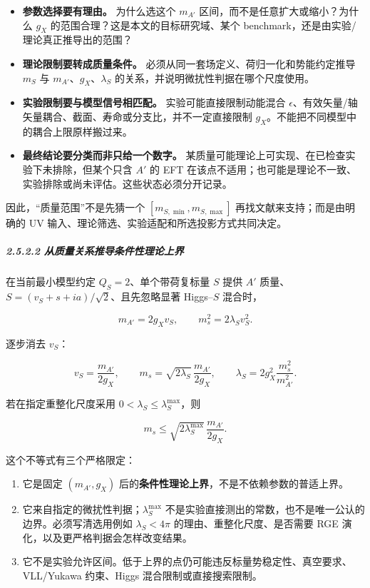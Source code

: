 \documentclass[
]{article}
\providecommand{\tightlist}{%
  \setlength{\itemsep}{0pt}\setlength{\parskip}{0pt}}
\begin{document}
\begin{itemize}
\tightlist
\item
  \textbf{参数选择要有理由。} 为什么选这个 \(m_{A'}\)
  区间，而不是任意扩大或缩小？为什么 \(g_X\)
  的范围合理？这是本文的目标研究域、某个
  benchmark，还是由实验/理论真正推导出的范围？
\item
  \textbf{理论限制要转成质量条件。}
  必须从同一套场定义、荷归一化和势能约定推导 \(m_S\) 与
  \(m_{A'}\)、\(g_X\)、\(\lambda_S\)
  的关系，并说明微扰性判据在哪个尺度使用。
\item
  \textbf{实验限制要与模型信号相匹配。} 实验可能直接限制动能混合
  \(\epsilon\)、有效矢量/轴矢量耦合、截面、寿命或分支比，并不一定直接限制
  \(g_X\)。不能把不同模型中的耦合上限原样搬过来。
\item
  \textbf{最终结论要分类而非只给一个数字。}
  某质量可能理论上可实现、在已检查实验下未排除，但某个只含 \(A'\) 的 EFT
  在该点不适用；也可能是理论不一致、实验排除或尚未评估。这些状态必须分开记录。
\end{itemize}

因此，``质量范围''不是先猜一个 \([m_{S,\min},m_{S,\max}]\)
再找文献来支持；而是由明确的 UV
输入、理论筛选、实验适配和所选投影方式共同决定。

\subparagraph{2.5.2.2
从质量关系推导条件性理论上界}\label{ux4eceux8d28ux91cfux5173ux7cfbux63a8ux5bfcux6761ux4ef6ux6027ux7406ux8bbaux4e0aux754c}

在当前最小模型约定 \(Q_S=2\)、单个带荷复标量 \(S\) 提供 \(A'\)
质量、\(S=(v_S+s+ia)/\sqrt2\)、且先忽略显著 Higgs--\(S\) 混合时，

\[m_{A'}=2g_Xv_S,\qquad m_s^2=2\lambda_Sv_S^2.\]

逐步消去 \(v_S\)：

\[v_S=\frac{m_{A'}}{2g_X},\qquad m_s=\sqrt{2\lambda_S}\,\frac{m_{A'}}{2g_X},\qquad \lambda_S=2g_X^2\frac{m_s^2}{m_{A'}^2}.\]

若在指定重整化尺度采用 \(0<\lambda_S\leq\lambda_S^{\max}\)，则

\[\boxed{m_s\leq \sqrt{2\lambda_S^{\max}}\,\frac{m_{A'}}{2g_X}}.\]

这个不等式有三个严格限定：

\begin{enumerate}
\def\labelenumi{\arabic{enumi}.}
\tightlist
\item
  它是固定 \((m_{A'},g_X)\)
  后的\textbf{条件性理论上界}，不是不依赖参数的普适上界。
\item
  它来自指定的微扰性判据；\(\lambda_S^{\max}\)
  不是实验直接测出的常数，也不是唯一公认的边界。必须写清选用例如
  \(\lambda_S<4\pi\) 的理由、重整化尺度、是否需要 RGE
  演化，以及更严格判据会怎样改变结果。
\item
  它不是实验允许区间。低于上界的点仍可能违反标量势稳定性、真空要求、VLL/Yukawa
  约束、Higgs 混合限制或直接搜索限制。
\end{enumerate}
\end{document}
